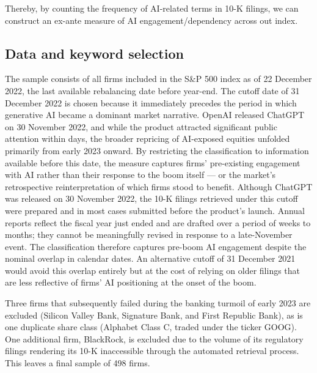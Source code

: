 \documentclass[12pt,a4paper]{article}
\begin{document}
Thereby, by counting the frequency of AI-related terms in 10-K filings, we can construct an ex-ante measure of AI engagement/dependency across out index. 

\subsection{Data and keyword selection}

The sample consists of all firms included in the S\&P 500 index as of 22 December 2022, the last available rebalancing date before year-end. The cutoff date of 31 December 2022 is chosen because it immediately precedes the period in which generative AI became a dominant market narrative. OpenAI released ChatGPT on 30 November 2022, and while the product attracted significant public attention within days, the broader repricing of AI-exposed equities unfolded primarily from early 2023 onward. By restricting the classification to information available before this date, the measure captures firms' pre-existing engagement with AI rather than their response to the boom itself — or the market's retrospective reinterpretation of which firms stood to benefit. Although ChatGPT was released on 30 November 2022, the 10-K filings retrieved under this cutoff were prepared and in most cases submitted before the product's launch. Annual reports reflect the fiscal year just ended and are drafted over a period of weeks to months; they cannot be meaningfully revised in response to a late-November event. The classification therefore captures pre-boom AI engagement despite the nominal overlap in calendar dates. An alternative cutoff of 31 December 2021 would avoid this overlap entirely but at the cost of relying on older filings that are less reflective of firms' AI positioning at the onset of the boom.

Three firms that subsequently failed during the banking turmoil of early 2023 are excluded (Silicon Valley Bank, Signature Bank, and First Republic Bank), as is one duplicate share class (Alphabet Class C, traded under the ticker GOOG). One additional firm, BlackRock, is excluded due to the volume of its regulatory filings rendering its 10-K inaccessible through the automated retrieval process. This leaves a final sample of 498 firms.
\end{document}
